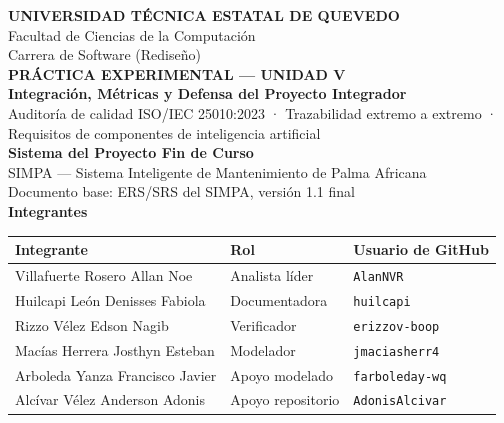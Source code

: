 \documentclass[11pt,letterpaper]{article}
\begin{document}
\begin{titlepage}
\centering
\vspace*{0.8cm}

{\large\textbf{UNIVERSIDAD TÉCNICA ESTATAL DE QUEVEDO}}\\[0.3cm]
{\normalsize Facultad de Ciencias de la Computación}\\[0.2cm]
{\normalsize Carrera de Software (Rediseño)}\\[1.4cm]

{\large\textbf{PRÁCTICA EXPERIMENTAL --- UNIDAD V}}\\[0.5cm]
{\Large\textbf{Integración, Métricas y Defensa del Proyecto Integrador}}\\[0.4cm]
{\normalsize Auditoría de calidad ISO/IEC 25010:2023 · Trazabilidad extremo a extremo · Requisitos de componentes de inteligencia artificial}\\[1.4cm]

{\normalsize\textbf{Sistema del Proyecto Fin de Curso}}\\[0.3cm]
{\large SIMPA --- Sistema Inteligente de Mantenimiento de Palma Africana}\\[0.2cm]
{\footnotesize Documento base: ERS/SRS del SIMPA, versión 1.1 final}\\[1.2cm]

{\normalsize\textbf{Integrantes}}\\[0.3cm]
\begin{tabular}{L{5.8cm} L{3.6cm} L{3.4cm}}
\toprule
\textbf{Integrante} & \textbf{Rol} & \textbf{Usuario de GitHub}\\
\midrule
Villafuerte Rosero Allan Noe & Analista líder & \texttt{AlanNVR}\\
Huilcapi León Denisses Fabiola & Documentadora & \texttt{huilcapi}\\
Rizzo Vélez Edson Nagib & Verificador & \texttt{erizzov-boop}\\
Macías Herrera Josthyn Esteban & Modelador & \texttt{jmaciasherr4}\\
Arboleda Yanza Francisco Javier & Apoyo modelado & \texttt{farboleday-wq}\\
Alcívar Vélez Anderson Adonis & Apoyo repositorio & \texttt{AdonisAlcivar}\\
\bottomrule
\end{tabular}\\[1.2cm]


\end{titlepage}
\end{document}
